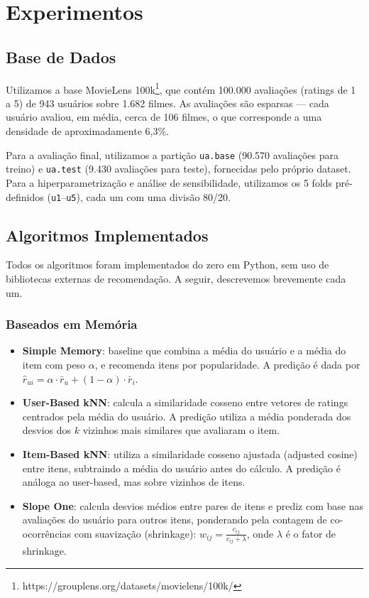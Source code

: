 \documentclass[sigconf,nonacm]{acmart}
\begin{document}
\section{Experimentos}

\subsection{Base de Dados}

Utilizamos a base MovieLens 100k\footnote{https://grouplens.org/datasets/movielens/100k/},
que contém 100.000 avaliações (ratings de 1 a 5) de 943 usuários sobre 1.682
filmes. As avaliações são esparsas --- cada usuário avaliou, em média, cerca de
106 filmes, o que corresponde a uma densidade de aproximadamente 6,3\%.

Para a avaliação final, utilizamos a partição \texttt{ua.base} (90.570
avaliações para treino) e \texttt{ua.test} (9.430 avaliações para teste),
fornecidas pelo próprio dataset. Para a hiperparametrização e análise de
sensibilidade, utilizamos os 5 folds pré-definidos (\texttt{u1}--\texttt{u5}),
cada um com uma divisão 80/20.

\subsection{Algoritmos Implementados}

Todos os algoritmos foram implementados do zero em Python, sem uso de
bibliotecas externas de recomendação. A seguir, descrevemos brevemente cada um.

\subsubsection{Baseados em Memória}

\begin{itemize}
  \item \textbf{Simple Memory}: baseline que combina a média do usuário e a
    média do item com peso $\alpha$, e recomenda itens por popularidade. A
    predição é dada por $\hat{r}_{ui} = \alpha \cdot \bar{r}_u + (1-\alpha) \cdot \bar{r}_i$.
  \item \textbf{User-Based kNN}: calcula a similaridade cosseno entre vetores
    de ratings centrados pela média do usuário. A predição utiliza a média
    ponderada dos desvios dos $k$ vizinhos mais similares que avaliaram o item.
  \item \textbf{Item-Based kNN}: utiliza a similaridade cosseno ajustada
    (adjusted cosine) entre itens, subtraindo a média do usuário antes do
    cálculo. A predição é análoga ao user-based, mas sobre vizinhos de itens.
  \item \textbf{Slope One}: calcula desvios médios entre pares de itens e
    prediz com base nas avaliações do usuário para outros itens, ponderando
    pela contagem de co-ocorrências com suavização (shrinkage):
    $w_{ij} = \frac{c_{ij}}{c_{ij} + \lambda}$, onde $\lambda$ é o fator de shrinkage.
\end{itemize}
\end{document}
